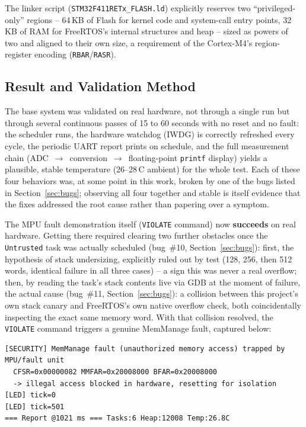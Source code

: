 \documentclass[sigconf,nonacm]{acmart}
\begin{document}
The linker script (\texttt{STM32F411RETx\_FLASH.ld}) explicitly reserves two ``privileged-only'' regions -- 64\,KB of Flash for kernel code and system-call entry points, 32\,KB of RAM for FreeRTOS's internal structures and heap -- sized as powers of two and aligned to their own size, a requirement of the Cortex-M4's region-register encoding (\texttt{RBAR}/\texttt{RASR}).

\subsection{Result and Validation Method}

The base system was validated on real hardware, not through a single run but through several continuous passes of 15 to 60 seconds with no reset and no fault: the scheduler runs, the hardware watchdog (IWDG) is correctly refreshed every cycle, the periodic UART report prints on schedule, and the full measurement chain (ADC~$\rightarrow$~conversion~$\rightarrow$~floating-point \texttt{printf} display) yields a plausible, stable temperature (26--28\,\textdegree{}C ambient) for the whole test. Each of these four behaviors was, at some point in this work, broken by one of the bugs listed in Section~\ref{sec:bugs}; observing all four together and stable is itself evidence that the fixes addressed the root cause rather than papering over a symptom.

The MPU fault demonstration itself (\texttt{VIOLATE} command) now \textbf{succeeds} on real hardware. Getting there required clearing two further obstacles once the \texttt{Untrusted} task was actually scheduled (bug~\#10, Section~\ref{sec:bugs}): first, the hypothesis of stack undersizing, explicitly ruled out by test (128, 256, then 512 words, identical failure in all three cases) -- a sign this was never a real overflow; then, by reading the task's stack contents live via GDB at the moment of failure, the actual cause (bug~\#11, Section~\ref{sec:bugs}): a collision between this project's own stack canary and FreeRTOS's own native overflow check, both coincidentally inspecting the exact same memory word. With that collision resolved, the \texttt{VIOLATE} command triggers a genuine MemManage fault, captured below:

\begin{lstlisting}[style=term]
[SECURITY] MemManage fault (unauthorized memory access) trapped by MPU/fault unit
  CFSR=0x00000082 MMFAR=0x20008000 BFAR=0x20008000
  -> illegal access blocked in hardware, resetting for isolation
[LED] tick=0
[LED] tick=501
=== Report @1021 ms === Tasks:6 Heap:12008 Temp:26.8C
\end{lstlisting}
\end{document}
